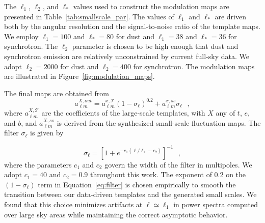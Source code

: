 \documentclass[twocolumn]{aastex631}
\newcommand{\giuse}[1]{\textcolor{orange}{(GP: #1)}}
\begin{document}
The $\ell_1$, $\ell_2$, and $\ell_*$ values used to construct the modulation maps are presented in Table~\ref{tab:smallscale_par}. The values of $\ell_1$ and $\ell_*$ are driven both by the angular resolution and the signal-to-noise ratio of the template maps. We employ $\ell_1=100$ and $\ell_*=80$ for dust and $\ell_1=38$ and $\ell_*=36$ for synchrotron. The $\ell_2$ parameter is chosen to be high enough that dust and synchrotron emission are relatively unconstrained by current full-sky data. We adopt  $\ell_2=2000$ for dust and $\ell_2 = 400$ for synchrotron. The modulation maps are illustrated in Figure~\ref{fig:modulation_maps}.



The final maps are obtained from 
\begin{equation} \label{eq:filter}
    a_{\ell m }^{X, out}=  a_{\ell m }^{x, \mathcal{T}} \left(1-\sigma_\ell\right)^{0.2} + a_{\ell m }^{x, ss} \sigma_\ell
    ~~~, 
\end{equation}
where $a_{\ell m }^{X, \mathcal{T}}$ are the coefficients of the large-scale templates, with $X$ any of $t$, $e$, and $b$, and $a_{\ell m }^{X, ss}$ is derived from the synthesized small-scale fluctuation maps. The filter $\sigma_\ell$ is given by

\begin{equation}
\sigma_\ell  = \left[1+  e^{ -c_1 (\ell/ \ell_1  -c_2 )}\right]^{-1}  
~~~,
\end{equation}
where the parameters $c_1$ and $c_2$ govern the width of the filter in multipoles. We adopt $c_1=40$ and $c_2=0.9$ throughout this work. The exponent of $0.2$ on the $\left(1-\sigma_\ell\right)$ term in Equation~\ref{eq:filter} is chosen empirically to smooth the transition between our data-driven templates and the generated small scales. We found that this choice minimizes artifacts at $\ell \simeq \ell_1$ in power spectra computed over large sky areas while maintaining the correct asymptotic behavior.
\end{document}
